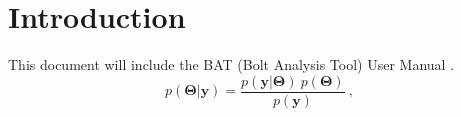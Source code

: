 \chapter{Introduction}
This document will include the BAT (Bolt Analysis Tool) User Manual \cite{ESAPSS} \cite{ECSS_HB_32_23A} \cite{VDI2230_1}.
\begin{equation}
  p(\bm{\Theta}|\bm{y}) = \frac{p(\bm{y}|\bm{\Theta})\ p(\bm{\Theta})}{p(\bm{y})}\ ,
\end{equation}
